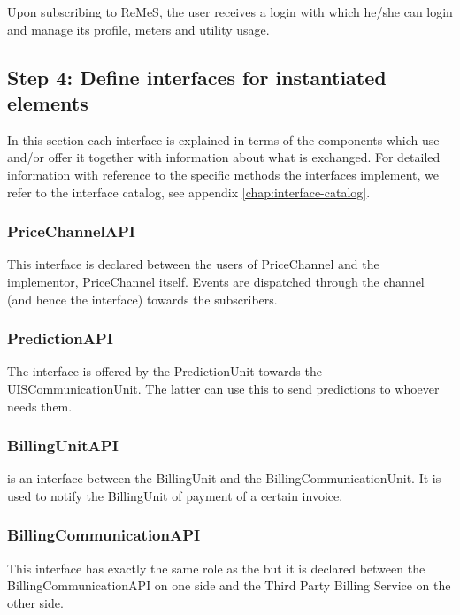 \npar Upon subscribing to ReMeS, the user receives a login with which he/she can
login and manage its profile, meters and utility usage. 

\subsection{Step 4: Define interfaces for instantiated elements}
\label{add:it10/interfaces}

\npar In this section each interface is explained in terms of the components
which use and/or offer it together with information about what is exchanged. For
detailed information with reference to the specific methods the interfaces
implement, we refer to the interface catalog, see appendix
\ref{chap:interface-catalog}.

\subsubsection{PriceChannelAPI}

\npar This interface is declared between the users of PriceChannel and the
implementor, PriceChannel itself. Events are dispatched through the channel
(and hence the interface) towards the subscribers.

\subsubsection{PredictionAPI}

\npar The  interface is offered by the PredictionUnit
towards the UISCommunicationUnit. The latter can use this to send predictions to
whoever needs them.

\subsubsection{BillingUnitAPI}

\npar {} is an interface between the BillingUnit and the
BillingCommunicationUnit. It is used to notify the BillingUnit of payment of a
certain invoice.

\subsubsection{BillingCommunicationAPI}

\npar This interface has exactly the same role as the 
but it is declared between the BillingCommunicationAPI on one side and the Third
Party Billing Service on the other side.

